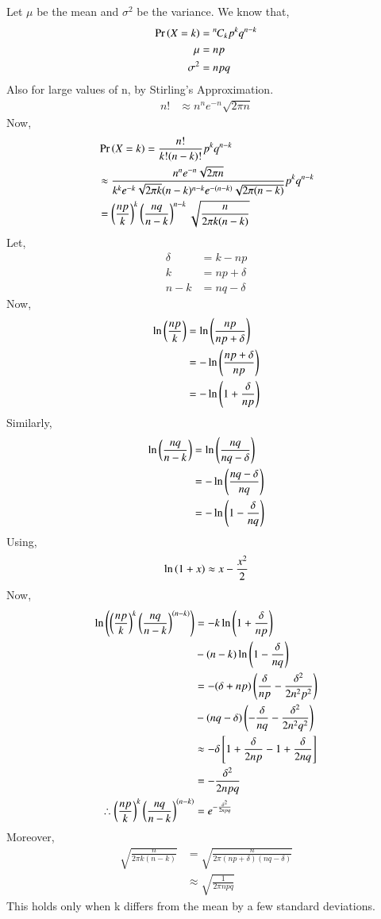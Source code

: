 \documentclass[journal,12pt,twocolumn]{IEEEtran}
\newcommand{\permcomb}[4][0mu]{{{}^{#3}\mkern#1#2_{#4}}}
\newcommand{\comb}[1][-1mu]{\permcomb[#1]{C}}
\begin{document}
\begin{enumerate}
Let $\mu$ be the mean and $\sigma^2$ be the variance.
We know that,
\begin{align}
    \pr{X=k} &= \comb{n}{k}p^kq^{n-k}\\
    \mu &= np\\
    \sigma^2 &= npq
\end{align}
Also for large values of n, by Stirling's Approximation.
\begin{align}
    n! &\approx n^n e^{-n} \sqrt{2\pi n}
\end{align}
Now,
\begin{align}
    &\Pr\left(X = k\right) = \frac{n!}{k!(n-k)!}p^kq^{n-k}\\
    &\approx \frac{n^n e^{-n} \sqrt{2\pi n}}{k^k e^{-k} \sqrt{2\pi k} (n-k)^{n-k} e^{-(n-k)} \sqrt{2\pi (n-k)}} p^k q^{n-k}\\
    &= \left(\frac{np}{k}\right)^k \left(\frac{nq}{n-k}\right)^{n-k} \sqrt{\frac{n}{2\pi k(n-k)}}
\end{align}
Let,
\begin{align}
    \delta &= k - np\\  
    k &= np + \delta\\
    n-k &= nq -\delta
\end{align}
Now,
\begin{align}
    \ln{\ensuremath{\left(\frac{np}{k}\right)}}&= \ln{\ensuremath{\left(\frac{np}{np+\delta}\right)}}\\
    &= -\ln{\ensuremath{\left(\frac{np+\delta}{np}\right)}}\\
    &= -\ln{\ensuremath{\left(1+\frac{\delta}{np}\right)}}
\end{align}
Similarly,
\begin{align}
    \ln{\ensuremath{\left(\frac{nq}{n-k}\right)}}&= \ln{\ensuremath{\left(\frac{nq}{nq-\delta}\right)}}\\
    &= -\ln{\ensuremath{\left(\frac{nq-\delta}{nq}\right)}}\\
    &= -\ln{\ensuremath{\left(1-\frac{\delta}{nq}\right)}}
\end{align}
Using,
\begin{align}
    \ln{\ensuremath{\left(1+x\right)}} \approx x-\frac{x^2}{2}
\end{align}
Now,
\begin{align}
    \ln{\ensuremath{\left(\left(\frac{np}{k}\right)^k \left(\frac{nq}{n-k}\right)^{(n-k)}\right)}}&=-k\ln{\ensuremath{\left(1+\frac{\delta}{np}\right)}}\nonumber\\
    &-(n-k)\ln{\ensuremath{\left(1-\frac{\delta}{nq}\right)}}\\
    &=-(\delta + np)\left(\frac{\delta}{np}-\frac{\delta^2}{2n^2 p^2}\right)\nonumber\\
    &-(nq-\delta)\left(-\frac{\delta}{nq}-\frac{\delta^2}{2n^2q^2}\right)\\
    &\approx -\delta {}\left[1+\frac{\delta}{2np}-1+\frac{\delta}{2nq}\right]\\
    &= - \frac{\delta^2}{2npq}\\
    \therefore \left(\frac{np}{k}\right)^k \left(\frac{nq}{n-k}\right)^{(n-k)}&=e^{-\frac{\delta^2}{2npq}}
\end{align}
Moreover,
\begin{align}
    \sqrt{\frac{n}{2\pi k(n-k)}} &= \sqrt{\frac{n}{2\pi (np+\delta)(nq-\delta)}}\\
    &\approx \sqrt{\frac{1}{2\pi npq}}
\end{align}
This holds only when k differs from the mean by a few standard deviations.


\end{enumerate}
\end{document}
